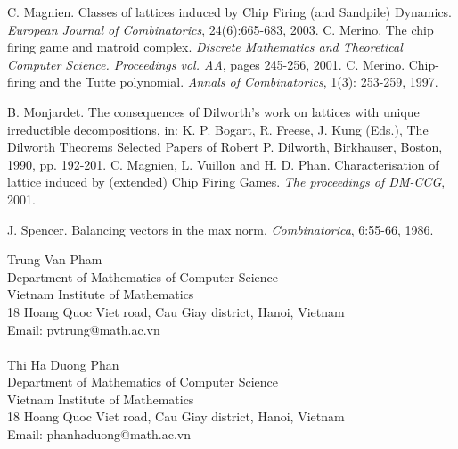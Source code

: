 \documentclass{article}
\theoremstyle{definition}
\begin{document}
\begin{thebibliography}{9}
 C. Magnien. Classes of lattices induced by Chip Firing (and Sandpile) Dynamics. \emph{European Journal of Combinatorics}, 24(6):665-683, 2003.
 C. Merino. The chip firing game and matroid complex. \emph{Discrete Mathematics and Theoretical Computer Science. Proceedings vol. AA}, pages 245-256, 2001.
 C. Merino. Chip-firing and the Tutte polynomial. \emph{Annals of Combinatorics}, 1(3): 253-259, 1997.

 B. Monjardet. The consequences of Dilworth's work on lattices with unique irreductible decompositions, in: K. P. Bogart, R. Freese, J. Kung (Eds.), The Dilworth Theorems Selected Papers of Robert P. Dilworth, Birkhauser, Boston, 1990, pp. 192-201.
 C. Magnien, L. Vuillon and H. D. Phan. Characterisation of lattice induced by (extended) Chip Firing Games. \emph{The proceedings of DM-CCG}, 2001.

 J. Spencer. Balancing vectors in the max norm. \emph{Combinatorica}, 6:55-66, 1986.
\end{thebibliography}
Trung Van Pham\\
Department of Mathematics of Computer Science\\
Vietnam Institute of Mathematics\\
18 Hoang Quoc Viet road, Cau Giay district, Hanoi, Vietnam\\
Email: pvtrung@math.ac.vn\\
\text{}\\
Thi Ha Duong Phan\\
Department of Mathematics of Computer Science\\
Vietnam Institute of Mathematics\\
18 Hoang Quoc Viet road, Cau Giay district, Hanoi, Vietnam\\
Email: phanhaduong@math.ac.vn
\end{document}
